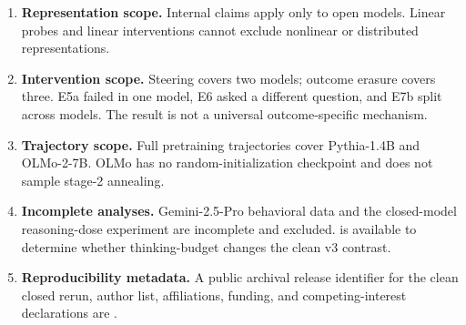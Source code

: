 \begin{enumerate}[leftmargin=*]
    \item \textbf{Representation scope.} Internal claims apply only to open models. Linear probes and linear interventions cannot exclude nonlinear or distributed representations.
    \item \textbf{Intervention scope.} Steering covers two models; outcome erasure covers three. E5a failed in one model, E6 asked a different question, and E7b split across models. The result is not a universal outcome-specific mechanism.
    \item \textbf{Trajectory scope.} Full pretraining trajectories cover Pythia-1.4B and OLMo-2-7B. OLMo has no random-initialization checkpoint and does not sample stage-2 annealing.
    \item \textbf{Incomplete analyses.} Gemini-2.5-Pro behavioral data and the closed-model reasoning-dose experiment are incomplete and excluded. \insufficient{} is available to determine whether thinking-budget changes the clean v3 contrast.
    \item \textbf{Reproducibility metadata.} A public archival release identifier for the clean closed rerun, author list, affiliations, funding, and competing-interest declarations are \missinginfo.
\end{enumerate}
